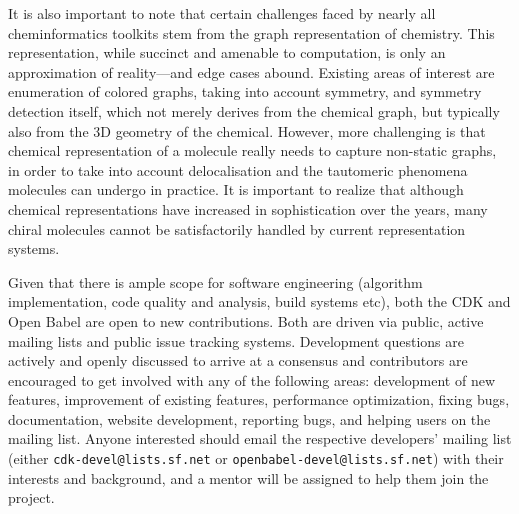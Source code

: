 \documentclass{sig-alternate}
\begin{document}
It is also important to note that certain challenges faced by nearly
all cheminformatics toolkits stem from the graph representation of
chemistry. This representation, while succinct and amenable to
computation, is only an approximation of reality---and edge cases
abound. Existing areas of interest are enumeration of colored graphs,
taking into account symmetry, and symmetry detection itself, which not
merely derives from the chemical graph, but typically also from the 3D
geometry of the chemical. However, more challenging is that chemical
representation of a molecule really needs to capture non-static
graphs, in order to take into account delocalisation and the tautomeric
phenomena molecules can undergo in practice. It is important to
realize that although chemical representations have increased in
sophistication over the years, many chiral molecules cannot be
satisfactorily handled by current representation systems.


Given that there is ample scope for software engineering (algorithm
implementation, code quality and analysis, build systems etc), both
the CDK and Open Babel are open to new contributions. Both are driven
via public, active mailing lists and public issue tracking systems.
Development questions are actively and openly discussed to arrive at a
consensus and contributors are encouraged to get involved with any of
the following areas: development of new features, improvement of
existing features, performance optimization, fixing bugs,
documentation, website development, reporting bugs, and helping users
on the mailing list. Anyone interested should email the respective
developers' mailing list (either \texttt{cdk-devel@lists.sf.net} or
\texttt{openbabel-devel@lists.sf.net}) with their interests and background, and
a mentor will be assigned to help them join the project.
%

%
\end{document}

